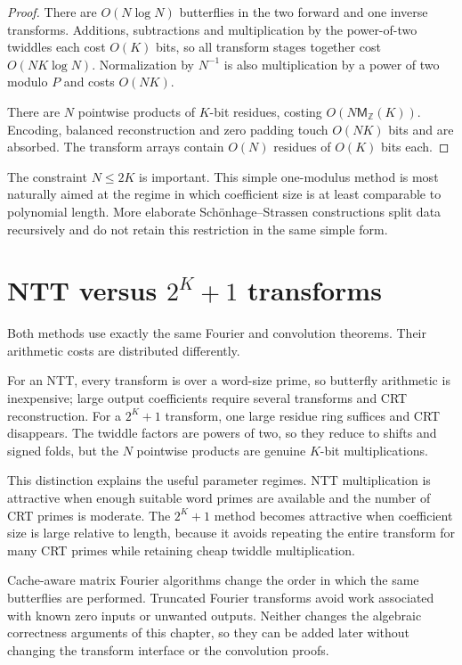 \documentclass[11pt]{book}
\theoremstyle{definition}
\newcommand{\ZZ}{\mathbb Z}
\newcommand{\MZ}{\mathsf M_{\ZZ}}
\begin{document}
\begin{proof}
There are $O(N\log N)$ butterflies in the two forward and one inverse
transforms.  Additions, subtractions and multiplication by the power-of-two
twiddles each cost $O(K)$ bits, so all transform stages together cost
$O(NK\log N)$.  Normalization by $N^{-1}$ is also multiplication by a power
of two modulo $P$ and costs $O(NK)$.

There are $N$ pointwise products of $K$-bit residues, costing
$O(N\MZ(K))$.  Encoding, balanced reconstruction and zero padding touch
$O(NK)$ bits and are absorbed.  The transform arrays contain $O(N)$ residues
of $O(K)$ bits each.
\end{proof}

The constraint $N\leq2K$ is important.  This simple one-modulus method is most
naturally aimed at the regime in which coefficient size is at least comparable
to polynomial length.  More elaborate Sch\"onhage--Strassen constructions
split data recursively and do not retain this restriction in the same simple
form.

\section{NTT versus $2^K+1$ transforms}

Both methods use exactly the same Fourier and convolution theorems.  Their
arithmetic costs are distributed differently.

For an NTT, every transform is over a word-size prime, so butterfly arithmetic
is inexpensive; large output coefficients require several transforms and CRT
reconstruction.  For a $2^K+1$ transform, one large residue ring suffices and
CRT disappears.  The twiddle factors are powers of two, so they reduce to
shifts and signed folds, but the $N$ pointwise products are genuine $K$-bit
multiplications.

This distinction explains the useful parameter regimes.  NTT multiplication
is attractive when enough suitable word primes are available and the number of
CRT primes is moderate.  The $2^K+1$ method becomes attractive when coefficient
size is large relative to length, because it avoids repeating the entire
transform for many CRT primes while retaining cheap twiddle multiplication.

Cache-aware matrix Fourier algorithms change the order in which the same
butterflies are performed.  Truncated Fourier transforms avoid work associated
with known zero inputs or unwanted outputs.  Neither changes the algebraic
correctness arguments of this chapter, so they can be added later without
changing the transform interface or the convolution proofs.
\end{document}
